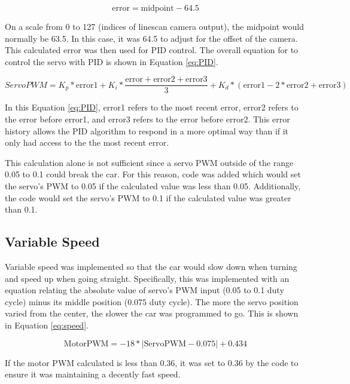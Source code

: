 \documentclass[conference]{IEEEtran}
\begin{document}
\begin{equation}
	\text{error} = \text{midpoint} - 64.5 \label{eq:error}
\end{equation}

On a scale from 0 to 127 (indices of linescan camera output), the midpoint would normally be 63.5. In this case, it was 64.5 to adjust for the offset of the camera. This calculated error was then used for PID control. The overall equation for to control the servo with PID is shown in Equation \ref{eq:PID}.

\begin{equation}
	ServoPWM = K_p*\text{error1} + K_i*\frac{\text{error} + \text{error2} + \text{error3}}{3}
	+ K_d*(\text{error1} - 2*\text{error2} + \text{error3}) \label{eq:PID}
\end{equation}

In this Equation \ref{eq:PID}, error1 refers to the most recent error, error2 refers to the error before error1, and error3 refers to the error before error2. This error history allows the PID algorithm to respond in a more optimal way than if it only had access to the the most recent error.

This calculation alone is not sufficient since a servo PWM outside of the range 0.05 to 0.1 could break the car. For this reason, code was added which would set the servo's PWM to 0.05 if the calculated value was less than 0.05. Additionally, the code would set the servo's PWM to 0.1 if the calculated value was greater than 0.1.

\subsection{Variable Speed}

Variable speed was implemented so that the car would slow down when turning and speed up when going straight. Specifically, this was implemented with an equation relating the absolute value of servo's PWM input (0.05 to 0.1 duty cycle) minus its middle position (0.075 duty cycle). The more the servo position varied from the center, the slower the car was programmed to go. This is shown in Equation \ref{eq:speed}.

\begin{equation}
	\text{MotorPWM} = -18*|\text{ServoPWM} - 0.075| + 0.434 \label{eq:speed}
\end{equation}

If the motor PWM calculated is less than 0.36, it was set to 0.36 by the code to ensure it was maintaining a decently fast speed.
\end{document}
